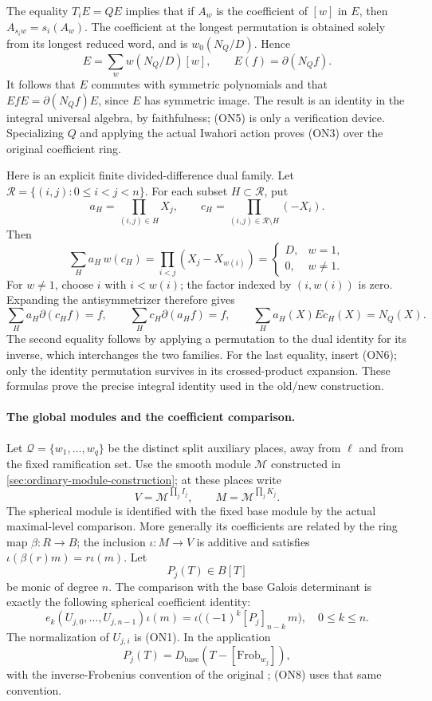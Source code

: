 The equality \(T_iE=QE\) implies that if \(A_w\) is the coefficient of
\([w]\) in \(E\), then \(A_{s_iw}=s_i(A_w)\).
The coefficient at the longest permutation is obtained solely from
its longest reduced word, and is
\(w_0(N_Q/D)\).  Hence
\[
 E=\sum_w w(N_Q/D)[w],\qquad
 E(f)=\partial(N_Qf).
 \tag{ON6}
\]
It follows that \(E\) commutes with symmetric polynomials and that
\(E f E=\partial(N_Qf)E\), since \(E\) has symmetric image.
The result is an identity in the integral universal algebra, by
faithfulness; (ON5) is only a verification device.
Specializing \(Q\) and applying the actual Iwahori action proves
(ON3) over the original coefficient ring.

Here is an explicit finite divided-difference dual family.
Let \(\mathcal R=\{(i,j):0\leq i<j<n\}\).
For each subset \(H\subset\mathcal R\), put
\[
 a_H=\prod_{(i,j)\in H}X_j,\qquad
 c_H=\prod_{(i,j)\in\mathcal R\setminus H}(-X_i).
\]
Then
\[
 \sum_H a_H\,w(c_H)=
 \prod_{i<j}(X_j-X_{w(i)})
 =\begin{cases}D,&w=1,\\0,&w\ne1.\end{cases}
\]
For \(w\ne1\), choose \(i\) with \(i<w(i)\); the factor indexed by
\((i,w(i))\) is zero.  Expanding the antisymmetrizer therefore gives
\[
 \sum_Ha_H\partial(c_Hf)=f,\qquad
 \sum_Hc_H\partial(a_Hf)=f,\qquad
 \sum_H a_H(X)E c_H(X)=N_Q(X).
 \tag{ON7}
\]
The second equality follows by applying a permutation to the dual
identity for its inverse, which interchanges the two families.
For the last equality, insert (ON6); only the identity permutation
survives in its crossed-product expansion.
These formulas prove the precise integral identity used in the
old/new construction.

\paragraph{The global modules and the coefficient comparison.}
Let \(\mathcal Q=\{w_1,\ldots,w_q\}\) be the distinct split auxiliary
places, away from \(\ell\) and from the fixed ramification set.
Use the smooth module \(\mathcal M\) constructed in
\ref{sec:ordinary-module-construction}; at these places write
\[
 V=\mathcal M^{\prod_j I_j},\qquad
 M=\mathcal M^{\prod_j K_j}.
\]
The spherical module is identified with the fixed base module by the
actual maximal-level comparison.  More generally its coefficients
are related by the ring map \(\beta:R\to B\); the inclusion
\(\iota:M\to V\) is additive and satisfies
\(\iota(\beta(r)m)=r\iota(m)\).
Let
\[
 P_j(T)\in B[T]
\]
be monic of degree \(n\).
The comparison with the base Galois determinant is exactly the
following spherical coefficient identity:
\[
 e_k(U_{j,0},\ldots,U_{j,n-1})\iota(m)
   =\iota\bigl((-1)^k[P_j]_{n-k}\,m\bigr),
 \quad 0\leq k\leq n.
 \tag{ON8}
\]
The normalization of \(U_{j,i}\) is (ON1).
In the application
\[
 P_j(T)=D_{\mathrm{base}}(T-[\mathrm{Frob}_{w_j}]),
\]
with the inverse-Frobenius convention of the original
; (ON8) uses that same convention.

